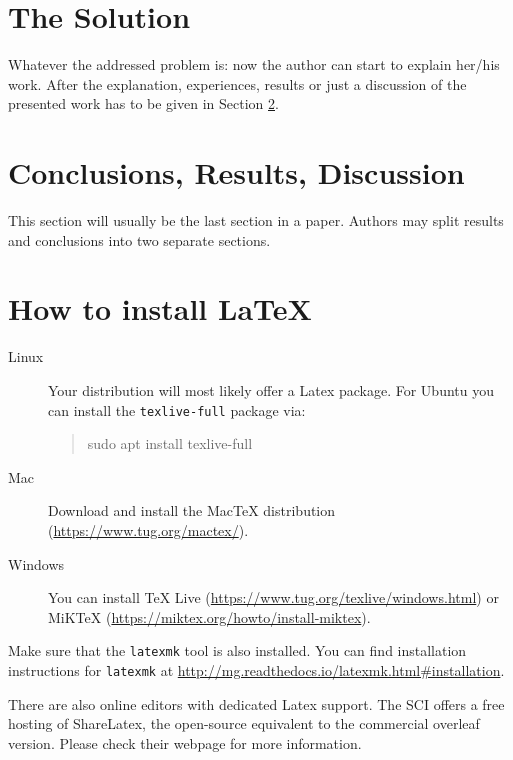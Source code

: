 \documentclass[]{rptuseminar}
\newenvironment{displayshellcommand}{%
	\begin{quote}%
	\ttfamily%
}{%
	\end{quote}%
}
\begin{document}
\section{The Solution}
\label{sec:solution}

Whatever the addressed problem is: now the author can start to explain her/his work.
After the explanation, experiences, results or just a discussion of the presented work has to be given in Section \ref{sec:conclusions}.

\section{Conclusions, Results, Discussion}
\label{sec:conclusions}

This section will usually be the last section in a paper.
Authors may split results and conclusions into two separate sections.



\newpage

\section{How to install \LaTeX{}}

\begin{description}
 \item[Linux]
Your distribution will most likely offer a Latex package.
For Ubuntu you can install the \lstinline!texlive-full! package via:

\begin{displayshellcommand}
  sudo apt install texlive-full
\end{displayshellcommand}

\item[Mac]
Download and install the MacTeX distribution (\url{https://www.tug.org/mactex/}).

\item[Windows]
You can install TeX Live (\url{https://www.tug.org/texlive/windows.html}) or MiKTeX (\url{https://miktex.org/howto/install-miktex}).
\end{description}

Make sure that the \lstinline!latexmk! tool is also installed.
You can find installation instructions for \lstinline!latexmk! at \url{http://mg.readthedocs.io/latexmk.html#installation}.

There are also online editors with dedicated Latex support.
The SCI offers a free hosting of ShareLatex, the open-source equivalent to the commercial overleaf version.
Please check their webpage for more information.
\end{document}
